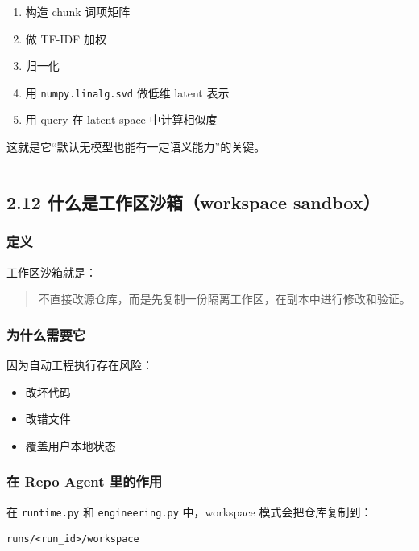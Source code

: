\documentclass[UTF8,12pt,openany]{ctexbook}
\begin{document}
\begin{enumerate}
\item 构造 chunk 词项矩阵
\item 做 TF-IDF 加权
\item 归一化
\item 用 \texttt{numpy.linalg.svd} 做低维 latent 表示
\item 用 query 在 latent space 中计算相似度
\end{enumerate}

这就是它“默认无模型也能有一定语义能力”的关键。\par

\hrule

\subsection{2.12 什么是工作区沙箱（workspace sandbox）}

\subsubsection{定义}

工作区沙箱就是：\par

\begin{quote}
不直接改源仓库，而是先复制一份隔离工作区，在副本中进行修改和验证。
\end{quote}

\subsubsection{为什么需要它}

因为自动工程执行存在风险：\par

\begin{itemize}
\item 改坏代码
\item 改错文件
\item 覆盖用户本地状态
\end{itemize}

\subsubsection{在 Repo Agent 里的作用}

在 \texttt{runtime.py} 和 \texttt{engineering.py} 中，workspace 模式会把仓库复制到：\par

\begin{lstlisting}
runs/<run_id>/workspace
\end{lstlisting}
\end{document}
